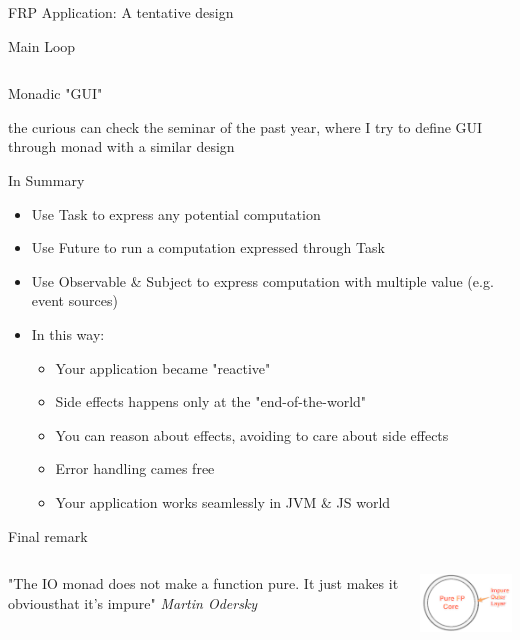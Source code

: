 \documentclass[presentation, 9pt]{beamer}\mode<presentation>{\usetheme{AMSBolognaFC}}
\begin{document}
\begin{frame}{FRP Application: A tentative design \href{https://github.com/cric96/scala-frp-gui}{\faLink}}
\begin{alertblock}{Main Loop}
\begin{tcolorbox}[left=0pt, top=0pt, bottom=0pt]
\begin{verbatim}
					\end{verbatim}
					\end{tcolorbox}
				\end{alertblock}	
				\begin{alertblock}{Monadic "GUI"}

the curious can check the seminar of the past year, where I try to define GUI through monad with a similar design \href{https://github.com/cric96/MVC-meets-monad/releases/tag/0.1.0-2021-06-04T085146}{\faLink}
				\end{alertblock}
\end{frame}
\begin{frame}[fragile]{In Summary}
	\begin{itemize}
		\item Use Task to express any potential computation
  	\item Use Future to run a computation expressed through Task 
   	\item Use Observable \& Subject to express computation with multiple value (e.g. event sources)
    \item In this way:
    \begin{itemize}
			\item Your application became "reactive" 
   		\item Side effects happens only at the "end-of-the-world"
     \item You can reason about effects, avoiding to care about side effects
     \item Error handling cames free
     \item Your application works seamlessly in JVM \& JS world
		\end{itemize}
	\end{itemize}
	\begin{alertblock}{Final remark}
		\begin{columns}
			\begin{column}[c]{0.4\textwidth}
				"The IO monad does not make a function pure. It just makes it obviousthat it's impure"
				\emph{Martin Odersky}
			\end{column}
			\begin{column}[c]{0.4\textwidth}

	\includegraphics[width=4cm]{img/pure-impure.png}
			\end{column}
		\end{columns}
	\end{alertblock}
\end{frame}
\end{document}
